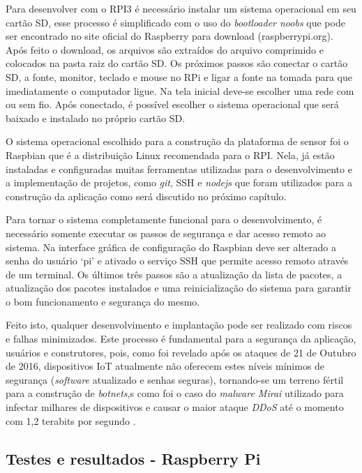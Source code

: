 Para desenvolver com o RPI3 é necessário instalar um sistema operacional
em seu cartão SD, esse processo é simplificado com o uso do \emph{bootloader noobs}
que pode ser encontrado no site oficial do Raspberry para download (raspberrypi.org). Após
feito o download, os arquivos são extraídos do arquivo comprimido e colocados na
pasta raiz do cartão SD. Os próximos passos são conectar o cartão SD, a fonte,
monitor, teclado e mouse no RPi e ligar a fonte na tomada
para que imediatamente o computador ligue. Na tela inicial deve-se escolher uma rede com ou sem fio.
Após conectado, é possível escolher o sistema operacional que será baixado e instalado no próprio cartão SD.

O sistema operacional escolhido para a construção da plataforma de sensor foi o
Raspbian que é a distribuição Linux recomendada para o RPI. Nela, já estão
instaladas e configuradas muitas ferramentas utilizadas para o desenvolvimento e
	a implementação de projetos, como \emph{git}, SSH e \emph{nodejs} que foram utilizados para a
construção da aplicação como será discutido no próximo capítulo.

Para tornar o sistema completamente funcional para o desenvolvimento, é
necessário somente executar os passos de segurança e dar acesso remoto
ao sistema. Na interface gráfica de configuração do Raspbian deve ser alterado
a senha do usuário ‘pi’ e ativado o serviço SSH que permite acesso remoto através
de um terminal. Os últimos três passos são a atualização da lista de pacotes,
a atualização dos pacotes instalados e uma reinicialização do sistema para
garantir o bom funcionamento e segurança do mesmo.

Feito isto, qualquer desenvolvimento e implantação pode ser realizado com riscos
e falhas minimizados. Este processo é fundamental para a segurança da aplicação,
usuários e construtores, pois, como foi revelado após os ataques de 21 de Outubro
de 2016, dispositivos IoT atualmente não oferecem estes níveis mínimos de
segurança (\emph{software} atualizado e senhas seguras), tornando-se um terreno
fértil para a construção de \emph{botnets},s como foi o caso do \emph{malware
Mirai} utilizado para infectar milhares de dispositivos e causar o maior ataque
\emph{DDoS} até o momento com 1,2 terabits por segundo
\cite{guardianMirai} \cite{nytimesMirai}.


\subsection{Testes e resultados - Raspberry Pi}
\label{subsec:testes-rpi}


